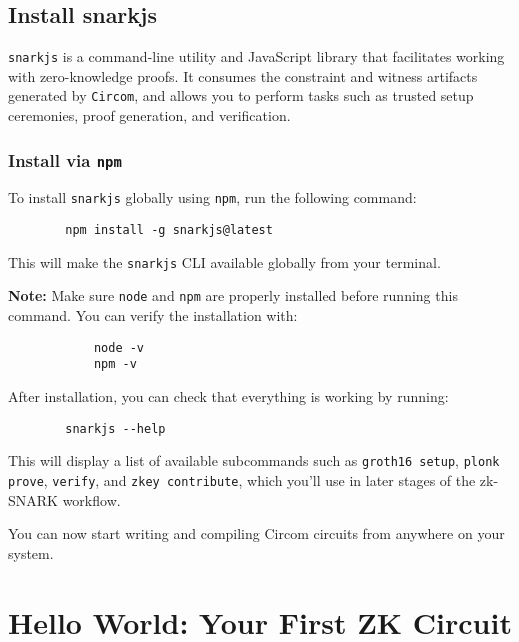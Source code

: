 \documentclass{article}
\begin{document}
	
	\subsection{Install snarkjs}
	
	\texttt{snarkjs} is a command-line utility and JavaScript library that facilitates working with zero-knowledge proofs. It consumes the constraint and witness artifacts generated by \texttt{Circom}, and allows you to perform tasks such as trusted setup ceremonies, proof generation, and verification.
	
	\subsubsection*{Install via \texttt{npm}}
	
	To install \texttt{snarkjs} globally using \texttt{npm}, run the following command:
	
		\begin{lstlisting}
		npm install -g snarkjs@latest
	\end{lstlisting}
	
	This will make the \texttt{snarkjs} CLI available globally from your terminal.
	
	\begin{noteBox}
		\textbf{Note:} Make sure \texttt{node} and \texttt{npm} are properly installed before running this command. You can verify the installation with:
		\begin{verbatim}
			node -v
			npm -v
		\end{verbatim}
	\end{noteBox}
	
	After installation, you can check that everything is working by running:
	
	\begin{verbatim}
		snarkjs --help
	\end{verbatim}
	
	This will display a list of available subcommands such as \texttt{groth16 setup}, \texttt{plonk prove}, \texttt{verify}, and \texttt{zkey contribute}, which you’ll use in later stages of the zk-SNARK workflow.
	
	You can now start writing and compiling Circom circuits from anywhere on your system.
	
\section{Hello World: Your First ZK Circuit}
\end{document}
